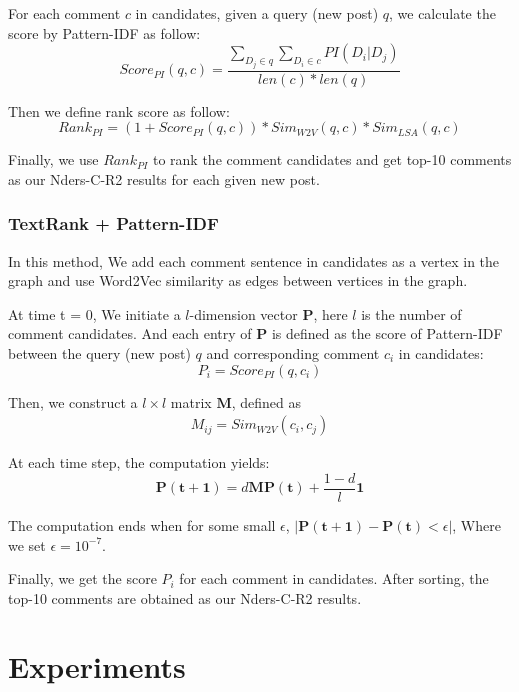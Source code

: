 \documentclass{sig-alternate}
\begin{document}
For each comment $c$ in candidates, given a query (new post) $q$, we calculate the score by Pattern-IDF as follow:
\begin{equation}
  Score_{PI}(q, c) = \frac{\sum_{D_j \in q}{\sum_{D_i \in c}{PI(D_i|D_j)}}}{len(c) * len(q)}
\end{equation}

Then we define rank score as follow:
\begin{equation}
  Rank_{PI} = (1 + Score_{PI}(q, c)) * Sim_{W2V}(q, c)*Sim_{LSA}(q, c)  
\end{equation}

Finally, we use $Rank_{PI}$ to rank the comment candidates and get top-10 comments as our Nders-C-R2 results for each given new post.

\subsubsection{TextRank + Pattern-IDF}
In this method, We add each comment sentence in candidates as a vertex in the 
graph and use Word2Vec similarity as edges between vertices in the graph. 

At time t = 0, We initiate a $l$-dimension vector $\bm{P}$, here $l$ is the 
number of comment candidates. And each entry of $\bm{P}$ is defined as the 
score of Pattern-IDF between the query (new post) $q$ and corresponding comment
$c_i$ in candidates:
\begin{equation}
  P_i = Score_{PI}(q, c_i)
\end{equation} 

Then, we construct a $l \times l$ matrix $\bm{M}$, defined as
\begin{equation}
  \begin{aligned}
    M_{ij} = Sim_{W2V}(c_i, c_j)
  \end{aligned}
\end{equation}

At each time step, the computation yields:
\begin{equation}
  \bm{P(t+1)} = d\bm{M}\bm{P(t)} + \frac{1-d}{l} \bm{1}
\end{equation}

The computation ends when for some small $\epsilon$, $|\bm{P(t+1)} - \bm{P(t)} < \epsilon|$, Where we set $\epsilon = 10^{-7}$.

Finally, we get the score $P_i$ for each comment in candidates. After sorting, 
the top-10 comments are obtained as our Nders-C-R2 results.

\section{Experiments}
\end{document}
